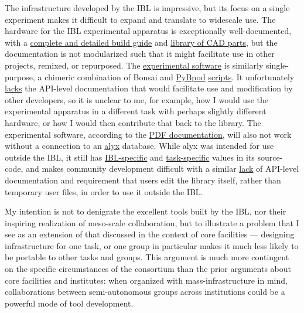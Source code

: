 The infrastructure developed by the IBL is impressive, but its focus on
a single experiment makes it difficult to expand and translate to
widescale use. The hardware for the IBL experimental apparatus is
exceptionally well-documented, with a
\href{https://figshare.com/articles/preprint/A_standardized_and_reproducible_method_to_measure_decision-making_in_mice_Appendix_3_IBL_protocol_for_setting_up_the_behavioral_training_rig/11634732}{complete
and detailed build guide} and
\href{https://figshare.com/articles/online_resource/A_standardized_and_reproducible_method_to_measure_decision-making_in_mice_CAD_files_for_behavior_rig/11639973}{library
of CAD parts}, but the documentation is not modularized such that it
might facilitate use in other projects, remixed, or repurposed. The
\href{https://github.com/int-brain-lab/iblrig}{experimental software} is
similarly single-purpose, a chimeric combination of Bonsai \citep{lopesBonsaiEventbasedFramework2015}  and
\href{https://github.com/pybpod/pybpod}{PyBpod}
\href{https://github.com/int-brain-lab/iblrig/tree/master/tasks/_iblrig_tasks_ephysChoiceWorld}{scripts}.
It unfortunately
\href{https://iblrig.readthedocs.io/en/latest/index.html}{lacks} the
API-level documentation that would facilitate use and modification by
other developers, so it is unclear to me, for example, how I would use
the experimental apparatus in a different task with perhaps slightly
different hardware, or how I would then contribute that back to the
library. The experimental software, according to the
\href{https://figshare.com/articles/preprint/A_standardized_and_reproducible_method_to_measure_decision-making_in_mice_Appendix_3_IBL_protocol_for_setting_up_the_behavioral_training_rig/11634732}{PDF
documentation}, will also not work without a connection to an
\href{https://github.com/cortex-lab/alyx}{alyx} database. While alyx was
intended for use outside the IBL, it still has
\href{https://github.com/cortex-lab/alyx/blob/07f481f6bbde668b81ad2634f4c42df4d6a74e44/alyx/data/management/commands/files.py\#L188}{IBL-specific}
and
\href{https://github.com/cortex-lab/alyx/blob/07f481f6bbde668b81ad2634f4c42df4d6a74e44/alyx/data/fixtures/data.datasettype.json\#L29}{task-specific}
values in its source-code, and makes community development difficult
with a similar \href{https://alyx.readthedocs.io/en/latest/}{lack} of
API-level documentation and requirement that users edit the library
itself, rather than temporary user files, in order to use it outside the
IBL.

My intention is not to denigrate the excellent tools built by the IBL,
nor their inspiring realization of meso-scale collaboration, but to
illustrate a problem that I see as an extension of that discussed in the
context of core facilities --- designing infrastructure for one task, or
one group in particular makes it much less likely to be portable to
other tasks and groups. This argument is much more contingent on the
specific circumstances of the consortium than the prior arguments about
core facilities and institutes: when organized with mass-infrastructure
in mind, collaborations between semi-autonomous groups across
institutions could be a powerful mode of tool development.

